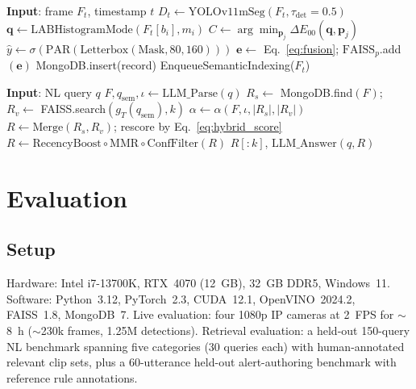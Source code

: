﻿\documentclass[conference]{IEEEtran}
\theoremstyle{definition}
\begin{document}
\begin{algorithm}
\caption{Detection and indexing per frame.}
\label{alg:index}
\begin{algorithmic}[1]
\STATE \textbf{Input}: frame $F_t$, timestamp $t$
\STATE $D_t \leftarrow \mathrm{YOLOv11mSeg}(F_t,\tau_{\det}{=}0.5)$
    \STATE $\mathbf{q}\leftarrow \mathrm{LABHistogramMode}(F_t[b_i],m_i)$
    \STATE $C\leftarrow \arg\min_{\mathbf{p}_j}\Delta E_{00}(\mathbf{q},\mathbf{p}_j)$
        \STATE $\hat{y}\leftarrow \sigma(\mathrm{PAR}(\mathrm{Letterbox}(\mathrm{Mask},80,160)))$
        \STATE $\mathbf{e}\leftarrow$ Eq.~\eqref{eq:fusion}; $\mathrm{FAISS}_p$.add$(\mathbf{e})$
    \ENDIF
    \STATE MongoDB.insert(record)
\ENDFOR
{} \STATE EnqueueSemanticIndexing($F_t$) \ENDIF
\end{algorithmic}
\end{algorithm}

\begin{algorithm}
\caption{NL query resolution using Eqs.~\eqref{eq:adaptive_alpha},~\eqref{eq:fusion}.}
\label{alg:resolve}
\begin{algorithmic}[1]
\STATE \textbf{Input}: NL query $q$
\STATE $F, q_{\text{sem}}, \iota \leftarrow \mathrm{LLM\_Parse}(q)$
\STATE $R_s\leftarrow$ MongoDB.find$(F)$; $R_v\leftarrow$ FAISS.search$(g_T(q_{\text{sem}}),k)$ 
\STATE $\alpha\leftarrow \alpha(F,\iota,|R_s|,|R_v|)$ 
\STATE $R\leftarrow \mathrm{Merge}(R_s,R_v)$; rescore by Eq.~\eqref{eq:hybrid_score}
\STATE $R\leftarrow \mathrm{RecencyBoost}\circ\mathrm{MMR}\circ\mathrm{ConfFilter}(R)$
\RETURN $R[:k]$, $\mathrm{LLM\_Answer}(q,R)$
\end{algorithmic}
\end{algorithm}

\section{Evaluation}\label{sec:eval}

\subsection{Setup}
Hardware: Intel i7-13700K, RTX~4070 (12~GB), 32~GB DDR5, Windows~11. Software: Python~3.12, PyTorch~2.3, CUDA~12.1, OpenVINO~2024.2, FAISS~1.8, MongoDB~7. Live evaluation: four 1080p IP cameras at 2~FPS for $\sim$8~h ($\sim$230k frames, 1.25M detections). Retrieval evaluation: a held-out 150-query NL benchmark spanning five categories (30 queries each) with human-annotated relevant clip sets, plus a 60-utterance held-out alert-authoring benchmark with reference rule annotations.
\end{document}
